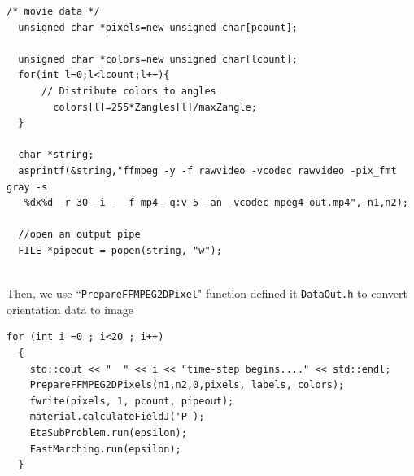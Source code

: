\documentclass[11pt]{article}
\begin{document}
\begin{tcolorbox}
\begin{lstlisting}[basicstyle=\footnotesize]
  /* movie data */
  unsigned char *pixels=new unsigned char[pcount];
  
  unsigned char *colors=new unsigned char[lcount];
  for(int l=0;l<lcount;l++){
      // Distribute colors to angles
        colors[l]=255*Zangles[l]/maxZangle;
  }
  
  char *string;
  asprintf(&string,"ffmpeg -y -f rawvideo -vcodec rawvideo -pix_fmt gray -s 
   %dx%d -r 30 -i - -f mp4 -q:v 5 -an -vcodec mpeg4 out.mp4", n1,n2);
  
  //open an output pipe
  FILE *pipeout = popen(string, "w");
  
\end{lstlisting}
\end{tcolorbox}
Then, we use ``\texttt{PrepareFFMPEG2DPixel}" function defined it
\texttt{DataOut.h} to convert orientation data to image

\begin{tcolorbox}
\begin{lstlisting}[basicstyle=\footnotesize]
  for (int i =0 ; i<20 ; i++)
  {
    std::cout << "  " << i << "time-step begins...." << std::endl;
    PrepareFFMPEG2DPixels(n1,n2,0,pixels, labels, colors);
    fwrite(pixels, 1, pcount, pipeout);
    material.calculateFieldJ('P');
    EtaSubProblem.run(epsilon);
    FastMarching.run(epsilon);
  }
\end{lstlisting}
\end{tcolorbox}




\newpage
\end{document}
